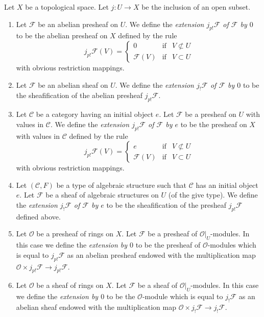\begin{definition}
\label{definition-j-shriek-structures}
Let $X$ be a topological space.
Let $j : U \to X$ be the inclusion of an open subset.
\begin{enumerate}
\item Let $\mathcal{F}$ be an abelian presheaf on $U$.
We define the {\it extension $j_{p!}\mathcal{F}$ of $\mathcal{F}$ by $0$}
to be the abelian presheaf on $X$ defined by the rule
$$
j_{p!}\mathcal{F}(V) =
\left\{
\begin{matrix}
0 & \text{if} & V \not \subset U \\
\mathcal{F}(V) & \text{if} & V \subset U
\end{matrix}
\right.
$$
with obvious restriction mappings.
\item Let $\mathcal{F}$ be an abelian sheaf on $U$. We define
the {\it extension $j_!\mathcal{F}$ of $\mathcal{F}$ by $0$}
to be the sheafification of the abelian presheaf $j_{p!}\mathcal{F}$.
\item Let $\mathcal{C}$ be a category having an initial object $e$.
Let $\mathcal{F}$ be a presheaf on $U$ with values in $\mathcal{C}$.
We define the {\it extension $j_{p!}\mathcal{F}$ of $\mathcal{F}$ by $e$}
to be the presheaf on $X$ with values in $\mathcal{C}$ defined by the
rule
$$
j_{p!}\mathcal{F}(V) =
\left\{
\begin{matrix}
e & \text{if} & V \not \subset U \\
\mathcal{F}(V) & \text{if} & V \subset U
\end{matrix}
\right.
$$
with obvious restriction mappings.
\item Let $(\mathcal{C}, F)$ be a type of algebraic structure
such that $\mathcal{C}$ has an initial object $e$.
Let $\mathcal{F}$ be a sheaf of algebraic structures on $U$
(of the give type). We define the
{\it extension $j_!\mathcal{F}$ of $\mathcal{F}$ by $e$}
to be the sheafification of the presheaf $j_{p!}\mathcal{F}$
defined above.
\item Let $\mathcal{O}$ be a presheaf of rings on $X$.
Let $\mathcal{F}$ be a presheaf of $\mathcal{O}|_U$-modules.
In this case we define the {\it extension by $0$}
to be the presheaf of $\mathcal{O}$-modules which is equal to
$j_{p!}\mathcal{F}$ as an abelian presheaf endowed with
the multiplication map
$\mathcal{O} \times j_{p!}\mathcal{F} \to j_{p!}\mathcal{F}$.
\item Let $\mathcal{O}$ be a sheaf of rings on $X$.
Let $\mathcal{F}$ be a sheaf of $\mathcal{O}|_U$-modules.
In this case we define the {\it extension by $0$}
to be the $\mathcal{O}$-module which is equal to
$j_!\mathcal{F}$ as an abelian sheaf endowed with
the multiplication map $\mathcal{O} \times j_!\mathcal{F} \to j_!\mathcal{F}$.
\end{enumerate}
\end{definition}

